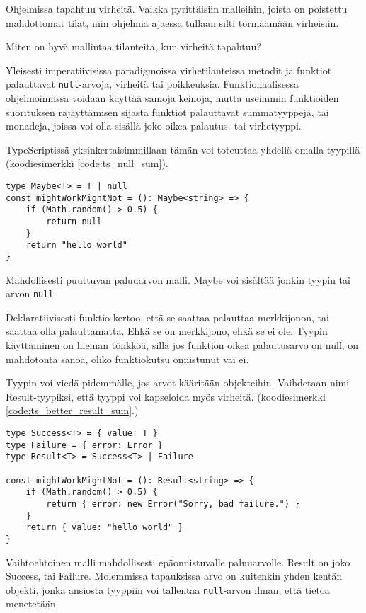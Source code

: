 Ohjelmissa tapahtuu virheitä. Vaikka pyrittäisiin malleihin, joista on poistettu mahdottomat tilat, niin ohjelmia ajaessa tullaan silti törmäämään virheisiin.

Miten on hyvä mallintaa tilanteita, kun virheitä tapahtuu?

Yleisesti imperatiivisissa paradigmoissa virhetilanteissa metodit ja funktiot palauttavat \texttt{null}-arvoja, virheitä tai poikkeuksia.
Funktionaalisessa ohjelmoinnissa voidaan käyttää samoja keinoja, mutta useimmin funktioiden suorituksen räjäyttämisen sijasta funktiot palauttavat summatyyppejä, tai monadeja, joissa voi olla sisällä joko oikea palautus- tai virhetyyppi.

TypeScriptissä yksinkertaisimmillaan tämän voi toteuttaa yhdellä omalla tyypillä (koodiesimerkki \ref{code:ts_null_sum}).

\begin{code}
    \begin{verbatim}
type Maybe<T> = T | null
const mightWorkMightNot = (): Maybe<string> => {
    if (Math.random() > 0.5) {
        return null
    }
    return "hello world"
}
    \end{verbatim}
    \caption{Mahdollisesti puuttuvan paluuarvon malli. Maybe voi sisältää jonkin tyypin tai arvon \texttt{null}}
    \label{code:ts_null_sum}
\end{code}

Deklaratiivisesti funktio kertoo, että se saattaa palauttaa merkkijonon, tai saattaa olla palauttamatta. Ehkä se on merkkijono, ehkä se ei ole.
Tyypin käyttäminen on hieman tönkköä, sillä jos funktion oikea palautusarvo on null, on mahdotonta sanoa, oliko funktiokutsu onnistunut vai ei.

Tyypin voi viedä pidemmälle, jos arvot kääritään objekteihin. Vaihdetaan nimi Result-tyypiksi, että tyyppi voi kapseloida myös virheitä. (koodiesimerkki \ref{code:ts_better_result_sum}.)

\begin{code}
    \begin{verbatim}
type Success<T> = { value: T }
type Failure = { error: Error }
type Result<T> = Success<T> | Failure 

const mightWorkMightNot = (): Result<string> => {
    if (Math.random() > 0.5) {
        return { error: new Error("Sorry, bad failure.") }
    }
    return { value: "hello world" }
}
    \end{verbatim}
    \caption{Vaihtoehtoinen malli mahdollisesti epäonnistuvalle paluuarvolle. Result on joko Success, tai Failure. Molemmissa tapauksissa arvo on kuitenkin yhden kentän objekti, jonka ansiosta tyyppiin voi tallentaa \texttt{null}-arvon ilman, että tietoa menetetään}
    \label{code:ts_better_result_sum}
\end{code}


